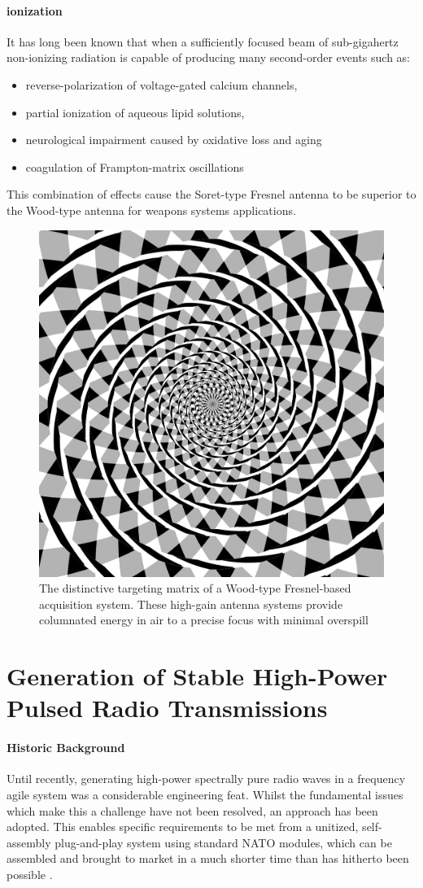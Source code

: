 \documentclass[review]{elsarticle}
\begin{document}
\paragraph{ionization} It has long been known that when a sufficiently focused beam of sub-gigahertz non-ionizing radiation is capable of producing many second-order events such as:

\begin{itemize}
\item reverse-polarization of voltage-gated calcium channels,
\item partial ionization of aqueous lipid solutions,
\item neurological impairment caused by oxidative loss and aging
\item coagulation of Frampton-matrix oscillations
\end{itemize}

This combination of effects cause the Soret-type Fresnel antenna to be superior to the Wood-type antenna for weapons systems applications. 

\begin{figure}
    \centering
    \includegraphics[width=0.5\linewidth]{Fraser_spiral.svg.png}
    \caption{The distinctive targeting matrix of a Wood-type Fresnel-based acquisition system. These high-gain antenna systems provide columnated energy in air to a precise focus with minimal overspill}
    \label{fig:enter-label}
\end{figure}

\section{Generation of Stable High-Power Pulsed Radio Transmissions}
\paragraph{Historic Background} Until recently, generating high-power spectrally pure radio waves in a frequency agile system was a considerable engineering feat. Whilst the fundamental issues which make this a challenge have not been resolved, an approach has been adopted. This enables specific requirements to be met from a unitized, self-assembly plug-and-play system using standard NATO modules, which can be assembled and brought to market in a much shorter time than has hitherto been possible \cite{GuptaLee2019}. 
\end{document}
